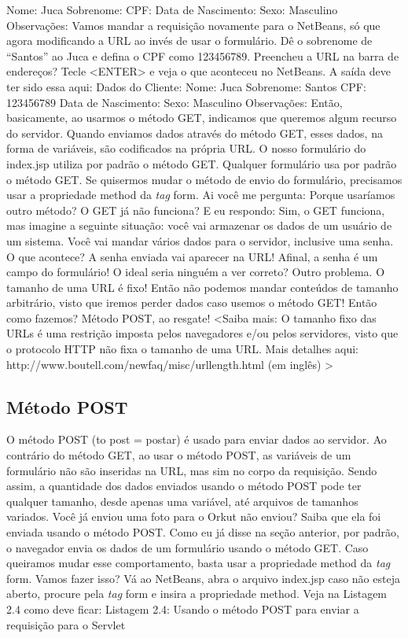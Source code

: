 Nome: Juca
Sobrenome: 
CPF: 
Data de Nascimento: 
Sexo: Masculino
Observações:
Vamos mandar a requisição novamente para o NetBeans, só que agora modificando a URL ao invés de usar o formulário. Dê o sobrenome de ``Santos'' ao Juca e defina o CPF como 123456789. Preencheu a URL na barra de endereços? Tecle <ENTER> e veja o que aconteceu no NetBeans. A saída deve ter sido essa aqui:
Dados do Cliente:
Nome: Juca
Sobrenome: Santos
CPF: 123456789
Data de Nascimento: 
Sexo: Masculino
Observações:
Então, basicamente, ao usarmos o método GET, indicamos que queremos algum recurso do servidor. Quando enviamos dados através do método GET, esses dados, na forma de variáveis, são codificados na própria URL. O nosso formulário do index.jsp utiliza por padrão o método GET. Qualquer formulário usa por padrão o método GET. Se quisermos mudar o método de envio do formulário, precisamos usar a propriedade method da \textit{tag} form. Ai você me pergunta: Porque usaríamos outro método? O GET já não funciona? E eu respondo: Sim, o GET funciona, mas imagine a seguinte situação: você vai armazenar os dados de um usuário de um sistema. Você vai mandar vários dados para o servidor, inclusive uma senha. O que acontece? A senha enviada vai aparecer na URL! Afinal, a senha é um campo do formulário! O ideal seria ninguém a ver correto? Outro problema. O tamanho de uma URL é fixo! Então não podemos mandar conteúdos de tamanho arbitrário, visto que iremos perder dados caso usemos o método GET! Então como fazemos? Método POST, ao resgate!
<Saiba mais:
O tamanho fixo das URLs é uma restrição imposta pelos navegadores e/ou pelos servidores, visto que o protocolo HTTP não fixa o tamanho de uma URL. Mais detalhes aqui: http://www.boutell.com/newfaq/misc/urllength.html (em inglês)
>



\subsection{Método POST}

O método POST (to post = postar) é usado para enviar dados ao servidor. Ao contrário do método GET, ao usar o método POST, as variáveis de um formulário não são inseridas na URL, mas sim no corpo da requisição. Sendo assim, a quantidade dos dados enviados usando o método POST pode ter qualquer tamanho, desde apenas uma variável, até arquivos de tamanhos variados. Você já enviou uma foto para o Orkut não enviou? Saiba que ela foi enviada usando o método POST.
Como eu já disse na seção anterior, por padrão, o navegador envia os dados de um formulário usando o método GET. Caso queiramos mudar esse comportamento, basta usar a propriedade method da \textit{tag} form. Vamos fazer isso? Vá ao NetBeans, abra o arquivo index.jsp caso não esteja aberto, procure pela \textit{tag} form e insira a propriedade method. Veja na Listagem 2.4 como deve ficar:
Listagem 2.4: Usando o método POST para enviar a requisição para o Servlet
 
